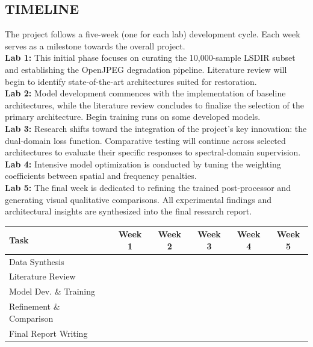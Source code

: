 \documentclass[12pt]{article}
\begin{document}
\subsection*{\large{T}\small{IMELINE}}

\quad The project follows a five-week (one for each lab) development cycle. Each week serves as a milestone towards the overall project. \\

\textbf{Lab 1:} This initial phase focuses on curating the 10,000-sample LSDIR subset and establishing the OpenJPEG degradation pipeline. Literature review will begin to identify state-of-the-art architectures suited for restoration. \\

\textbf{Lab 2:} Model development commences with the implementation of baseline architectures, while the literature review concludes to finalize the selection of the primary architecture. Begin training runs on some developed models. \\

\textbf{Lab 3:} Research shifts toward the integration of the project's key innovation: the dual-domain loss function. Comparative testing will continue across selected architectures to evaluate their specific responses to spectral-domain supervision. \\

\textbf{Lab 4:} Intensive model optimization is conducted by tuning the weighting coefficients between spatial and frequency penalties. \\

\textbf{Lab 5:} The final week is dedicated to refining the trained post-processor and generating visual qualitative comparisons. All experimental findings and architectural insights are synthesized into the final research report. \\

\begin{center}
\renewcommand{\arraystretch}{1.8}
\setlength{\tabcolsep}{10pt}
\begin{tabular}{|l|c|c|c|c|c|}
\hline
\textbf{Task} & \textbf{Week 1} & \textbf{Week 2} & \textbf{Week 3} & \textbf{Week 4} & \textbf{Week 5} \\ \hline
Data Synthesis & \cellcolor{red!60} & & & & \\ \hline
Literature Review & \multicolumn{2}{c|}{\cellcolor{orange!60}} & & & \\ \hline
Model Dev. \& Training & & \multicolumn{3}{c|}{\cellcolor{cyan!60}} & \\ \hline
Refinement \& Comparison & & & \multicolumn{2}{c|}{\cellcolor{green!60}} & \\ \hline
Final Report Writing & & & & & \cellcolor{purple!40} \\ \hline
\end{tabular}
\caption{Project timeline at a glance}
\end{center}
\end{document}
